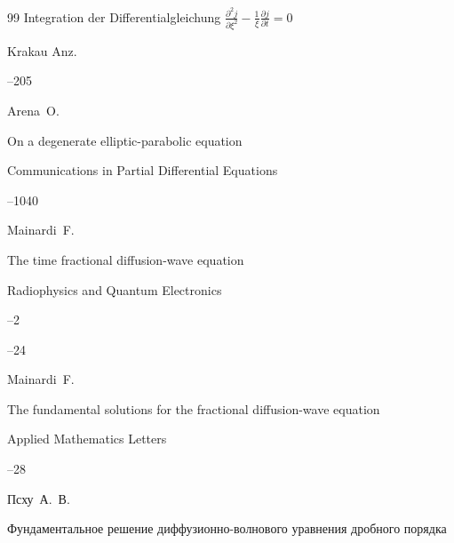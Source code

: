 \begin{thebibliography}{99}
\paper Integration der Differentialgleichung $\frac{\partial^2 j }{\partial \xi^2}-\frac{1}{\xi}

\frac{\partial j }{\partial t}=0$ 

\inbook  Krakau Anz. 


--205





\by Arena~O.

\paper On a degenerate elliptic-parabolic equation

\jour Communications in Partial Differential Equations




--1040 





\by Mainardi~F.

\paper The time fractional diffusion-wave equation

\jour Radiophysics and Quantum Electronics


--2


--24





\by Mainardi~F.

\paper The fundamental solutions for the fractional diffusion-wave equation

\jour Applied Mathematics Letters




--28





\by Псху~А.~В.

\paper Фундаментальное решение диффузионно-волнового уравнения дробного порядка


\end{thebibliography}
